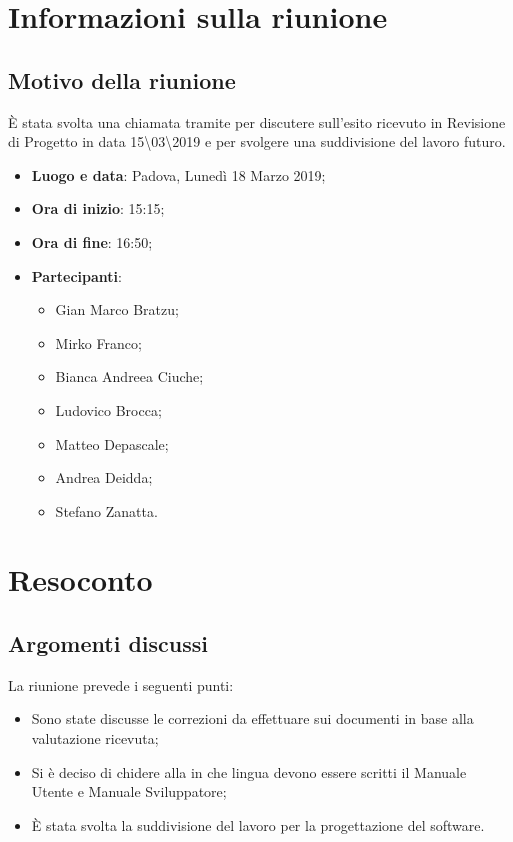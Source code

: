 \documentclass[a4paper,12pt]{article}
\begin{document}
	\tableofcontents
	\cleardoublepage
	\section{Informazioni sulla riunione}
	\subsection{Motivo della riunione} \`{E} stata svolta una chiamata tramite   per discutere sull'esito ricevuto in Revisione di Progetto in data 15\textbackslash03\textbackslash2019 e per svolgere una suddivisione del lavoro futuro.
	\begin{itemize}
		\item \textbf{Luogo e data}: Padova, Lunedì \label{key}18 Marzo 2019;
		\item \textbf{Ora di inizio}: 15:15;
		\item \textbf{Ora di fine}: 16:50;
		\item \textbf{Partecipanti}:  
		\begin{itemize}
			\item Gian Marco Bratzu;
			\item Mirko Franco;
			\item Bianca Andreea Ciuche;
			\item Ludovico Brocca;
			\item Matteo Depascale;
			\item Andrea Deidda;
			\item Stefano Zanatta.
		\end{itemize}
	\end{itemize}
	
	
	\section{Resoconto}
	\subsection{Argomenti discussi}
	La riunione prevede i seguenti punti:
	\begin{itemize}		
		\item Sono state discusse le correzioni da effettuare sui documenti in base alla valutazione ricevuta;
		\item Si è deciso di chidere alla   in che lingua devono essere scritti il Manuale Utente e Manuale Sviluppatore;
		\item \`{E} stata svolta la suddivisione del lavoro per la progettazione del software.
	\end{itemize}
\end{document}
